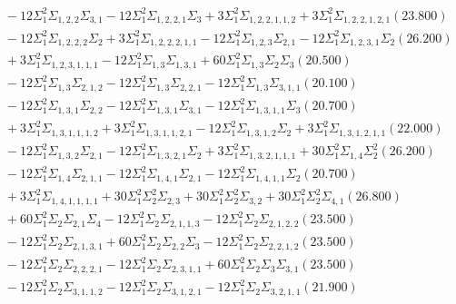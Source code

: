 \documentclass[12pt]{article}
\begin{document}
\begin{landscape}
\begin{align*}
		&\quad\quad -12\Sigma_{1}^{2}\Sigma_{1,2,2}\Sigma_{3,1}-12\Sigma_{1}^{2}\Sigma_{1,2,2,1}\Sigma_{3}+3\Sigma_{1}^{2}\Sigma_{1,2,2,1,1,2}+3\Sigma_{1}^{2}\Sigma_{1,2,2,1,2,1}(23.800) \\ 
		&\quad\quad -12\Sigma_{1}^{2}\Sigma_{1,2,2,2}\Sigma_{2}+3\Sigma_{1}^{2}\Sigma_{1,2,2,2,1,1}-12\Sigma_{1}^{2}\Sigma_{1,2,3}\Sigma_{2,1}-12\Sigma_{1}^{2}\Sigma_{1,2,3,1}\Sigma_{2}(26.200) \\ 
		&\quad\quad +3\Sigma_{1}^{2}\Sigma_{1,2,3,1,1,1}-12\Sigma_{1}^{2}\Sigma_{1,3}\Sigma_{1,3,1}+60\Sigma_{1}^{2}\Sigma_{1,3}\Sigma_{2}\Sigma_{3}(20.500) \\ 
		&\quad\quad -12\Sigma_{1}^{2}\Sigma_{1,3}\Sigma_{2,1,2}-12\Sigma_{1}^{2}\Sigma_{1,3}\Sigma_{2,2,1}-12\Sigma_{1}^{2}\Sigma_{1,3}\Sigma_{3,1,1}(20.100) \\ 
		&\quad\quad -12\Sigma_{1}^{2}\Sigma_{1,3,1}\Sigma_{2,2}-12\Sigma_{1}^{2}\Sigma_{1,3,1}\Sigma_{3,1}-12\Sigma_{1}^{2}\Sigma_{1,3,1,1}\Sigma_{3}(20.700) \\ 
		&\quad\quad +3\Sigma_{1}^{2}\Sigma_{1,3,1,1,1,2}+3\Sigma_{1}^{2}\Sigma_{1,3,1,1,2,1}-12\Sigma_{1}^{2}\Sigma_{1,3,1,2}\Sigma_{2}+3\Sigma_{1}^{2}\Sigma_{1,3,1,2,1,1}(22.000) \\ 
		&\quad\quad -12\Sigma_{1}^{2}\Sigma_{1,3,2}\Sigma_{2,1}-12\Sigma_{1}^{2}\Sigma_{1,3,2,1}\Sigma_{2}+3\Sigma_{1}^{2}\Sigma_{1,3,2,1,1,1}+30\Sigma_{1}^{2}\Sigma_{1,4}\Sigma_{2}^{2}(26.200) \\ 
		&\quad\quad -12\Sigma_{1}^{2}\Sigma_{1,4}\Sigma_{2,1,1}-12\Sigma_{1}^{2}\Sigma_{1,4,1}\Sigma_{2,1}-12\Sigma_{1}^{2}\Sigma_{1,4,1,1}\Sigma_{2}(20.700) \\ 
		&\quad\quad +3\Sigma_{1}^{2}\Sigma_{1,4,1,1,1,1}+30\Sigma_{1}^{2}\Sigma_{2}^{2}\Sigma_{2,3}+30\Sigma_{1}^{2}\Sigma_{2}^{2}\Sigma_{3,2}+30\Sigma_{1}^{2}\Sigma_{2}^{2}\Sigma_{4,1}(26.800) \\ 
		&\quad\quad +60\Sigma_{1}^{2}\Sigma_{2}\Sigma_{2,1}\Sigma_{4}-12\Sigma_{1}^{2}\Sigma_{2}\Sigma_{2,1,1,3}-12\Sigma_{1}^{2}\Sigma_{2}\Sigma_{2,1,2,2}(23.500) \\ 
		&\quad\quad -12\Sigma_{1}^{2}\Sigma_{2}\Sigma_{2,1,3,1}+60\Sigma_{1}^{2}\Sigma_{2}\Sigma_{2,2}\Sigma_{3}-12\Sigma_{1}^{2}\Sigma_{2}\Sigma_{2,2,1,2}(23.500) \\ 
		&\quad\quad -12\Sigma_{1}^{2}\Sigma_{2}\Sigma_{2,2,2,1}-12\Sigma_{1}^{2}\Sigma_{2}\Sigma_{2,3,1,1}+60\Sigma_{1}^{2}\Sigma_{2}\Sigma_{3}\Sigma_{3,1}(23.500) \\ 
		&\quad\quad -12\Sigma_{1}^{2}\Sigma_{2}\Sigma_{3,1,1,2}-12\Sigma_{1}^{2}\Sigma_{2}\Sigma_{3,1,2,1}-12\Sigma_{1}^{2}\Sigma_{2}\Sigma_{3,2,1,1}(21.900) \\ 

\end{align*}
\end{landscape}
\end{document}
